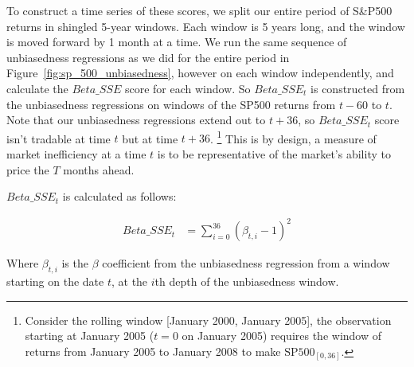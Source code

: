 To construct a time series of these scores, we split our entire period of S\&P500 returns in shingled 5-year windows. Each window is 5 years long, and the window is moved forward by 1 month at a time.
We run the same sequence of unbiasedness regressions as we did for the entire period in Figure~\ref{fig:sp_500_unbiasedness}, however on each window independently, and calculate the $Beta\_SSE$ score for each window.
So $Beta\_SSE_t$ is constructed from the unbiasedness regressions on windows of the SP500 returns from $t-60$ to $t$.
 Note that our unbiasedness regressions extend out to $t+36$, so $Beta\_SSE_t$ score isn't tradable at time $t$ but at time $t+36$.
\footnote{Consider the rolling window [January 2000, January 2005], the observation starting at January 2005 ($t=0$ on January 2005) requires the window of returns from January 2005 to January 2008 to make $\mathrm{SP500}_{[0, 36]}$.}
This is by design, a measure of market inefficiency at a time $t$ is to be representative of the market's ability to price the $T$ months ahead.

$Beta\_SSE_t$ is calculated as follows:

\begin{equation}
    \begin{aligned}
        Beta\_SSE_t &= \sum_{i=0}^{36} (\beta_{t,i} - 1)^2
    \end{aligned}
\end{equation}

Where $\beta_{t,i}$ is the $\beta$ coefficient from the unbiasedness regression from a 
window starting on the date $t$, at the $i$th depth of the unbiasedness window.
